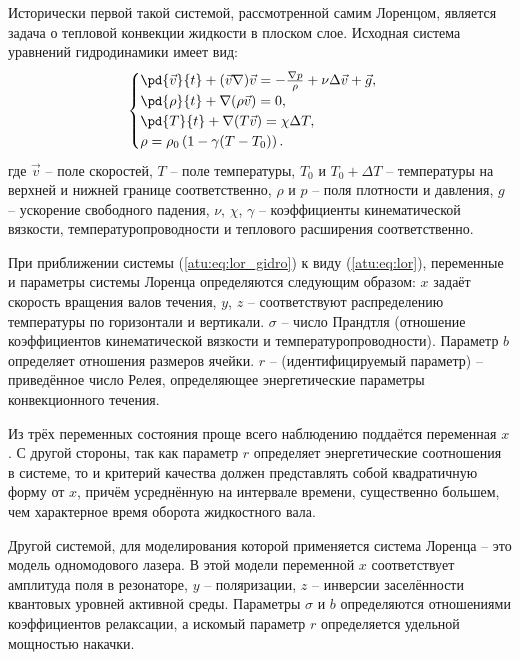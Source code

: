 Исторически первой такой системой, рассмотренной самим Лоренцом, является
задача о тепловой конвекции жидкости в плоском слое. Исходная система
уравнений гидродинамики имеет вид:
%
%
\begin{equation}
\begin{cases}
  \pd{\vec{v}}{t} + ( \vec{v} \nabla ) \vec{v} = - \frac{\nabla p}{\rho} + \nu \Delta \vec{v} + \vec{g}, \\
  \pd{\rho}{t} + \nabla ( \rho \vec{v} ) = 0 , \\
  \pd{T}{t} +\nabla ( T \vec{v} ) = \chi \Delta T , \\
  \rho = \rho_0 \left( 1 - \gamma (T - T_0) \right) .
\end{cases}
\label{atu:eq:lor_gidro}
\end{equation}
%
где
$\vec{v} $   -- поле скоростей,
$T$ -- поле температуры,
$T_0$ и $T_0+\Delta T$   -- температуры на верхней и нижней границе соответственно,
$\rho$ и $p$ -- поля плотности и давления,
$g$ -- ускорение свободного падения,
$\nu$, $\chi$, $\gamma$  -- коэффициенты кинематической вязкости, температуропроводности и
теплового расширения соответственно.

При приближении системы (\ref{atu:eq:lor_gidro}) к виду (\ref{atu:eq:lor}),
переменные и параметры системы
Лоренца определяются следующим образом: $x$ задаёт скорость вращения валов
течения, $y$, $z$ -- соответствуют распределению температуры по горизонтали и
вертикали.
$\sigma$   -- число Прандтля (отношение коэффициентов кинематической вязкости и
температуропроводности). Параметр $b$ определяет отношения размеров ячейки.
$r$ -- (идентифицируемый параметр) -- приведённое число Релея, определяющее
энергетические параметры конвекционного течения.

Из трёх переменных состояния проще всего наблюдению поддаётся переменная
$x$. С другой стороны, так как параметр $r$ определяет энергетические
соотношения в системе, то и критерий качества должен представлять собой
квадратичную форму от $x$, причём усреднённую на интервале времени,
существенно большем, чем характерное время оборота жидкостного вала.

Другой системой, для моделирования которой применяется система Лоренца --
это модель одномодового лазера. В этой модели переменной $x$ соответствует
амплитуда поля в резонаторе, $y$ -- поляризации, $z$ -- инверсии заселённости
квантовых уровней активной среды. Параметры $\sigma$ и $b$
определяются отношениями коэффициентов релаксации, а искомый параметр $r$
определяется удельной мощностью накачки.

